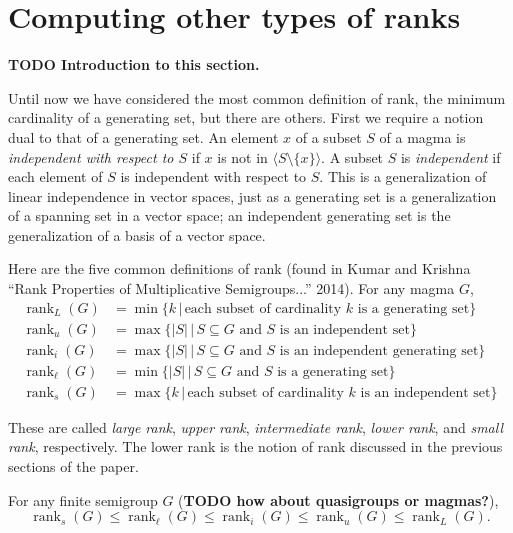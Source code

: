 \documentclass{article}
\newcommand{\todo}[1]{\textbf{TODO #1}}
\newcommand{\gen}[1]{\langle #1 \rangle}
\DeclareMathOperator{\rank}{rank}
\begin{document}
\section{Computing other types of ranks}

\todo{Introduction to this section.}

Until now we have considered the most common definition of rank, the minimum cardinality of a generating set, but there are others.
First we require a notion dual to that of a generating set.
An element $x$ of a subset $S$ of a magma is \emph{independent with respect to $S$} if $x$ is not in $\gen{S \setminus \{x\}}$.
A subset $S$ is \emph{independent} if each element of $S$ is independent with respect to $S$.
This is a generalization of linear independence in vector spaces, just as a generating set is a generalization of a spanning set in a vector space; an independent generating set is the generalization of a basis of a vector space.

Here are the five common definitions of rank (found in Kumar and Krishna ``Rank Properties of Multiplicative Semigroups...'' 2014).
For any magma $G$,
\begin{align*}
  \rank_L(G) & = \min \{ k \, | \, \text{each subset of cardinality } k \text{ is a generating set}\} \\
  \rank_u(G) & = \max \{ |S| \, | \, S \subseteq G \text{ and } S \text{ is an independent set} \} \\
  \rank_i(G) & = \max \{ |S| \, | \, S \subseteq G \text{ and } S \text{ is an independent generating set} \} \\
  \rank_\ell(G) & = \min \{ |S| \, | \, S \subseteq G \text{ and } S \text{ is a generating set} \} \\
  \rank_s(G) & = \max \{ k \, | \, \text{each subset of cardinality } k \text{ is an independent set} \}
\end{align*}

These are called \emph{large rank}, \emph{upper rank}, \emph{intermediate rank}, \emph{lower rank}, and \emph{small rank}, respectively.
The lower rank is the notion of rank discussed in the previous sections of the paper.
\begin{proposition}
  For any finite semigroup $G$ (\todo{how about quasigroups or magmas?}),
  \begin{equation*}
    \rank_s(G) \leq \rank_\ell(G) \leq \rank_i(G) \leq \rank_u(G) \leq \rank_L(G).
  \end{equation*}
\end{proposition}
\end{document}
